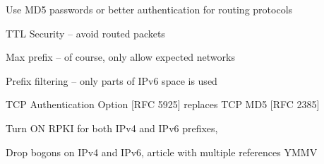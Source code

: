 \documentclass[Screen16to9,17pt]{foils}
\begin{document}


\begin{list2}
\item Use MD5 passwords or better authentication for routing protocols {\myalert}
\item TTL Security -- avoid routed packets
\item Max prefix -- of course, only allow expected networks
\item Prefix filtering -- only parts of IPv6 space is used
\item TCP Authentication Option [RFC 5925] replaces TCP MD5 [RFC 2385]
\item Turn ON RPKI for both IPv4 and IPv6 prefixes, {\myalert} \\
\item Drop bogons on IPv4 and IPv6, article with multiple references YMMV\\
\end{list2}
\end{document}
